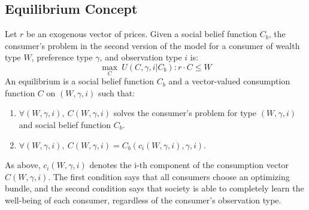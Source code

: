 \documentclass{article}
\begin{document}
\subsection{Equilibrium Concept}
Let $r$ be an exogenous vector of prices.  
%
Given a social belief function $C_b$, the consumer's problem in the second version of the model for a consumer of wealth type $W$, preference type $\gamma$, and observation type $i$ is:
\[ \max_C \ U(C,\gamma,i|C_b) :  r\cdot C \le W\]
An equilibrium is a social belief function $C_b$ and a vector-valued consumption function $C$ on $(W,\gamma,i)$ such that:
\begin{enumerate}
	\item $\forall (W,\gamma,i), \ C(W,\gamma,i)$ solves the consumer's problem for type $(W,\gamma,i)$ and social belief function $C_b$.
	\item $\forall (W,\gamma,i), \ C(W,\gamma,i) = C_b(c_i(W,\gamma,i),\gamma,i).$
\end{enumerate}
As above, $c_i(W,\gamma,i)$ denotes the i-th component of the consumption vector $C(W,\gamma,i)$.
The first condition says that all consumers choose an optimizing  bundle, and the second condition says that society is able to completely learn the well-being of each consumer, regardless of the consumer's observation type.
%
\end{document}
